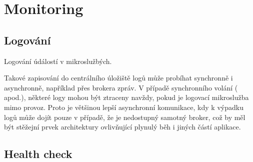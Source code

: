 \section{Monitoring}\label{sec:msa-monitoring}

\subsection{Logování}\label{subsec:msa-monitoring-logging}

Logování údálostí v mikroslužbých.

Takové zapisování do centrálního úložiště logů může probíhat synchronně i asynchronně, například přes brokera zpráv.
V případě synchronního volání (  apod.), některé logy mohou být ztraceny navždy, pokud je logovací mikroslužba mimo provoz.
Proto je většinou lepší asynchronní komunikace, kdy k výpadku logů může dojít pouze v případě, že je nedostupný samotný broker, což by měl být stěžejní prvek architektury ovlivňující plynulý běh i jiných částí aplikace.

\subsection{Health check}\label{subsec:msa-monitoring-healthcheck}
